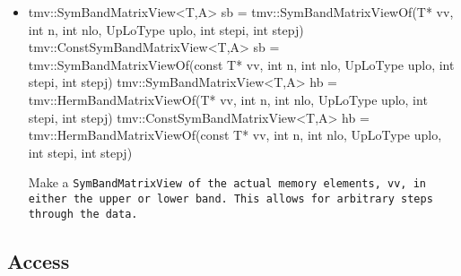 \begin{itemize}
\item
\begin{tmvcode}
tmv::SymBandMatrixView<T,A> sb = 
      tmv::SymBandMatrixViewOf(T* vv, int n, int nlo, 
          UpLoType uplo, int stepi, int stepj)
tmv::ConstSymBandMatrixView<T,A> sb = 
      tmv::SymBandMatrixViewOf(const T* vv, int n, int nlo, 
          UpLoType uplo, int stepi, int stepj)
tmv::SymBandMatrixView<T,A> hb = 
      tmv::HermBandMatrixViewOf(T* vv, int n, int nlo, 
          UpLoType uplo, int stepi, int stepj)
tmv::ConstSymBandMatrixView<T,A> hb = 
      tmv::HermBandMatrixViewOf(const T* vv, int n, int nlo, 
          UpLoType uplo, int stepi, int stepj)
\end{tmvcode}
Make a \tt{SymBandMatrixView} of the actual memory elements, \tt{vv}, in either the 
upper or lower band.  This allows for arbitrary steps through the data.

\end{itemize}

\subsection{Access}
\label{SymBandMatrix_Access}


